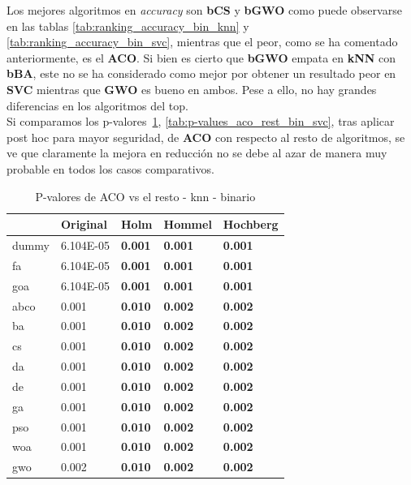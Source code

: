 Los mejores algoritmos en \textit{accuracy} son \textbf{bCS} y \textbf{bGWO} como puede observarse en las tablas \ref{tab:ranking_accuracy_bin_knn} y \ref{tab:ranking_accuracy_bin_svc}, mientras que el peor, como se ha comentado anteriormente, es el \textbf{ACO}. Si bien es cierto que \textbf{bGWO} empata en \textbf{kNN} con \textbf{bBA}, este no se ha considerado como mejor por obtener un resultado peor en \textbf{SVC} mientras que \textbf{GWO} es bueno en ambos. Pese a ello, no hay grandes diferencias en los algoritmos del top.\\[6pt]

Si comparamos los p-valores~\ref{tab:p-values_aco_rest_bin_knn}, \ref{tab:p-values_aco_rest_bin_svc}, tras aplicar post hoc para mayor seguridad, de \textbf{ACO} con respecto al resto de algoritmos, se ve que claramente la mejora en reducción no se debe al azar de manera muy probable en todos los casos comparativos.

\begin{table}[htp]
    \centering
    \begin{tabular}{lllll}
        \toprule
        {}    & Original  & Holm           & Hommel         & Hochberg       \\
        \midrule
        dummy & 6.104E-05 & \textbf{0.001} & \textbf{0.001} & \textbf{0.001} \\
        fa    & 6.104E-05 & \textbf{0.001} & \textbf{0.001} & \textbf{0.001} \\
        goa   & 6.104E-05 & \textbf{0.001} & \textbf{0.001} & \textbf{0.001} \\
        abco  & 0.001     & \textbf{0.010} & \textbf{0.002} & \textbf{0.002} \\
        ba    & 0.001     & \textbf{0.010} & \textbf{0.002} & \textbf{0.002} \\
        cs    & 0.001     & \textbf{0.010} & \textbf{0.002} & \textbf{0.002} \\
        da    & 0.001     & \textbf{0.010} & \textbf{0.002} & \textbf{0.002} \\
        de    & 0.001     & \textbf{0.010} & \textbf{0.002} & \textbf{0.002} \\
        ga    & 0.001     & \textbf{0.010} & \textbf{0.002} & \textbf{0.002} \\
        pso   & 0.001     & \textbf{0.010} & \textbf{0.002} & \textbf{0.002} \\
        woa   & 0.001     & \textbf{0.010} & \textbf{0.002} & \textbf{0.002} \\
        gwo   & 0.002     & \textbf{0.010} & \textbf{0.002} & \textbf{0.002} \\
        \bottomrule
    \end{tabular}
    \caption{P-valores de ACO vs el resto - knn - binario}
    \label{tab:p-values_aco_rest_bin_knn}
\end{table}

